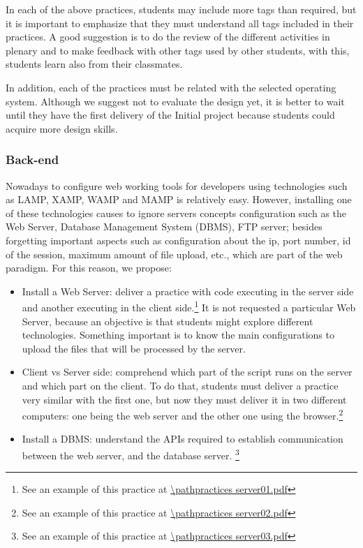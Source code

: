 In each of the above practices, students may include more tags than required, 
but it is important to emphasize that they must understand all tags 
included in their practices. A good suggestion is to do the review of the different 
activities in plenary and to make feedback with other tags used by other students,
with this, students learn also from their classmates. 

In addition, each of the practices must be related with the selected operating system. 
Although we suggest not to evaluate the design yet, it is better to wait until 
they have the first delivery of the Initial project because students could acquire 
more design skills.

\subsubsection{Back-end}
Nowadays to configure web working tools for developers using technologies such as LAMP, XAMP, WAMP 
and MAMP is relatively easy. 
However, installing one of these technologies causes to ignore servers concepts configuration
such as the Web Server, Database Management System (DBMS), FTP server; besides forgetting important 
aspects such as configuration about the ip, port number, id of the session, maximum amount 
of file upload, etc., which are part of the web paradigm. For this reason, we propose:
\begin{itemize}
    \item Install a Web Server: deliver a practice with code 
        executing in the server side and another executing in the client side.\footnote{See 
            an example of this practice at \url{\pathpractices server01.pdf}} 
        It is not requested a particular Web Server, because an objective is that students 
        might explore different technologies. Something important is to know the main
        configurations to upload the files that will be processed by the server. 
    \item Client vs Server side: comprehend which part of the script runs 
        on the server and which part on the client. To do that, students must deliver a practice 
        very similar with the first one, but now they must deliver it in two different 
        computers: one being the web server and the other one using the browser.\footnote{See an
            example of this practice at \url{\pathpractices server02.pdf}}
    \item Install a DBMS: understand the APIs required to establish communication between the web server, 
        and the database server. \footnote{See an example of this practice at \url{\pathpractices server03.pdf}}
\end{itemize}


